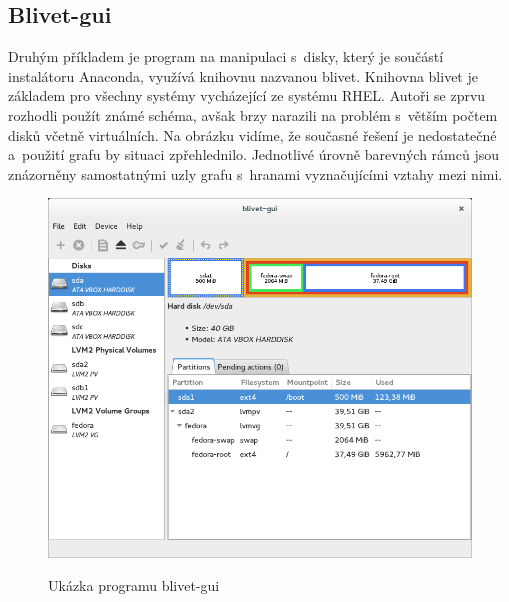\documentclass[a4paper]{article}
\begin{document}
\subsection{Blivet-gui}

Druhým příkladem je program na manipulaci s~disky, který je součástí instalátoru Anaconda, využívá knihovnu nazvanou blivet. Knihovna blivet je základem pro všechny systémy vycházející ze systému RHEL. Autoři 
se zprvu rozhodli použít známé schéma, avšak brzy narazili na problém s~větším počtem disků včetně virtuálních. Na obrázku vidíme, že současné řešení je nedostatečné a~použití grafu by
situaci zpřehlednilo. Jednotlivé úrovně barevných rámců jsou znázorněny samostatnými uzly grafu s~hranami vyznačujícími vztahy mezi nimi. 
\printbibliography

\begin{figure}[hb]
\label{fig:blivet}
\caption{Ukázka programu blivet-gui~\cite{blivet-gui}}
\centering
\includegraphics[width=.8\columnwidth]{pics/blivet-gui-1.png}\\
\end{figure}
\printindex
\end{document}
